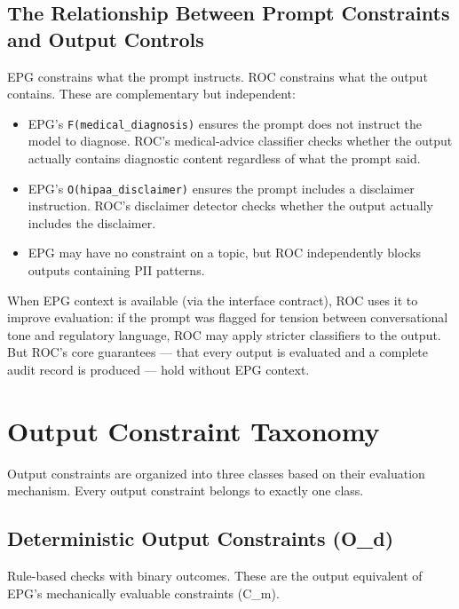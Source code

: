 \subsection{The Relationship Between Prompt Constraints and Output Controls}


EPG constrains what the prompt instructs. ROC constrains what the output contains. These are complementary but independent:

\begin{itemize}
  \item EPG's \texttt{F(medical\_\allowbreak{}diagnosis)} ensures the prompt does not instruct the model to diagnose. ROC's medical-advice classifier checks whether the output actually contains diagnostic content regardless of what the prompt said.
  \item EPG's \texttt{O(hipaa\_\allowbreak{}disclaimer)} ensures the prompt includes a disclaimer instruction. ROC's disclaimer detector checks whether the output actually includes the disclaimer.
  \item EPG may have no constraint on a topic, but ROC independently blocks outputs containing PII patterns.
\end{itemize}


When EPG context is available (via the interface contract), ROC uses it to improve evaluation: if the prompt was flagged for tension between conversational tone and regulatory language, ROC may apply stricter classifiers to the output. But ROC's core guarantees --- that every output is evaluated and a complete audit record is produced --- hold without EPG context.



\section{Output Constraint Taxonomy}
\label{sec:controls-4}


Output constraints are organized into three classes based on their evaluation mechanism. Every output constraint belongs to exactly one class.

\subsection{Deterministic Output Constraints (O\_d)}


Rule-based checks with binary outcomes. These are the output equivalent of EPG's mechanically evaluable constraints (C\_\allowbreak{}m).


